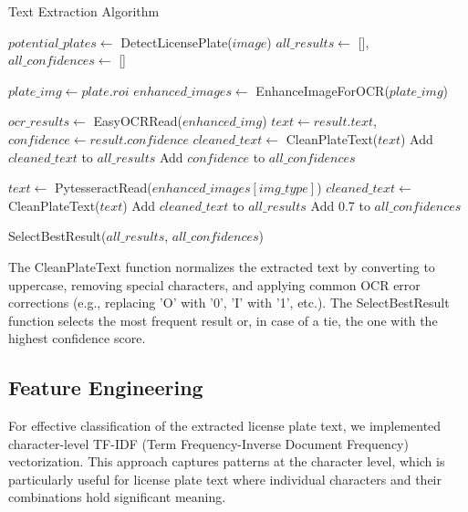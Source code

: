 \documentclass[conference]{IEEEtran}
\begin{document}
\begin{algorithm}[h]
\caption{Text Extraction Algorithm}
\label{alg:text_extraction}
\scriptsize
\begin{algorithmic}[1]
    \State $potential\_plates \gets$ DetectLicensePlate($image$)
    \State $all\_results \gets$ [], $all\_confidences \gets$ []
    
        \State $plate\_img \gets plate.roi$
        \State $enhanced\_images \gets$ EnhanceImageForOCR($plate\_img$)
        
                \State $ocr\_results \gets$ EasyOCRRead($enhanced\_img$)
                    \State $text \gets result.text$, $confidence \gets result.confidence$
                    \State $cleaned\_text \gets$ CleanPlateText($text$)
                        \State Add $cleaned\_text$ to $all\_results$
                        \State Add $confidence$ to $all\_confidences$
                    \EndIf
                \EndFor
            \EndFor
        \EndIf
        
                \State $text \gets$ PytesseractRead($enhanced\_images[img\_type]$)
                \State $cleaned\_text \gets$ CleanPlateText($text$)
                    \State Add $cleaned\_text$ to $all\_results$
                    \State Add 0.7 to $all\_confidences$ 
                \EndIf
            \EndFor
        \EndIf
    \EndFor
    
    \State \Return SelectBestResult($all\_results$, $all\_confidences$)
\EndProcedure
\end{algorithmic}
\end{algorithm}

The CleanPlateText function normalizes the extracted text by converting to uppercase, removing special characters, and applying common OCR error corrections (e.g., replacing 'O' with '0', 'I' with '1', etc.). The SelectBestResult function selects the most frequent result or, in case of a tie, the one with the highest confidence score.

\subsection{Feature Engineering}
For effective classification of the extracted license plate text, we implemented character-level TF-IDF (Term Frequency-Inverse Document Frequency) vectorization. This approach captures patterns at the character level, which is particularly useful for license plate text where individual characters and their combinations hold significant meaning.
\end{document}
